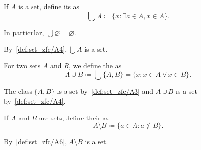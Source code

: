 \begin{definition}\label{def:set_union}\cite[24]{Enderton1977}
  If \( A \) is a set, define its  as
  \begin{equation*}
    \bigcup A \coloneqq \{ x \colon \exists a \in A, x \in A \}.
  \end{equation*}

  In particular, \( \bigcup \varnothing = \varnothing \).

  By~\ref{def:set_zfc/A4}, \( \bigcup A \) is a set.

  For two sets \( A \) and \( B \), we define the  as
  \begin{equation*}
    A \cup B \coloneqq \bigcup \{ A, B \} = \{ x \colon x \in A \lor x \in B \}.
  \end{equation*}

  The class \( \{ A, B \} \) is a set by~\ref{def:set_zfc/A3} and \( A \cup B \) is a set by~\ref{def:set_zfc/A4}.
\end{definition}

\begin{definition}\label{def:set_difference}\cite[27]{Enderton1977}
  If \( A \) and \( B \) are sets, define their  as
  \begin{equation*}
    A \setminus B \coloneqq \{ a \in A \colon a \not\in B \}.
  \end{equation*}

  By~\ref{def:set_zfc/A6}, \( A \setminus B \) is a set.
\end{definition}

